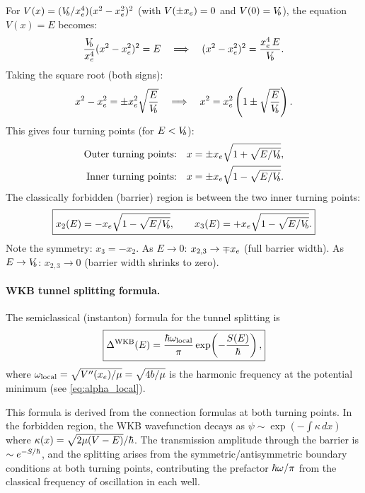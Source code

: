 For $V(x) = (V_{\!b}/x_e^4)(x^2 - x_e^2)^2$ (with $V(\pm x_e) = 0$ and $V(0) = V_{\!b}$), the equation $V(x) = E$ becomes:
\begin{equation}
  \frac{V_{\!b}}{x_e^4}(x^2 - x_e^2)^2 = E
  \quad\Longrightarrow\quad
  (x^2 - x_e^2)^2 = \frac{x_e^4\,E}{V_{\!b}}.
\end{equation}
Taking the square root (both signs):
\begin{equation}
  x^2 - x_e^2 = \pm x_e^2\sqrt{\frac{E}{V_{\!b}}}
  \quad\Longrightarrow\quad
  x^2 = x_e^2\left(1 \pm \sqrt{\frac{E}{V_{\!b}}}\right).
\end{equation}
This gives four turning points (for $E < V_{\!b}$):
\begin{align}
  \text{Outer turning points:}\quad & x = \pm x_e\sqrt{1 + \sqrt{E/V_{\!b}}},\label{eq:tp_outer}\\
  \text{Inner turning points:}\quad & x = \pm x_e\sqrt{1 - \sqrt{E/V_{\!b}}}.\label{eq:tp_inner}
\end{align}
The classically forbidden (barrier) region is between the two inner turning points:
\begin{equation}\label{eq:barrier_region}
  \boxed{x_2(E) = -x_e\sqrt{1 - \sqrt{E/V_{\!b}}}, \qquad x_3(E) = +x_e\sqrt{1 - \sqrt{E/V_{\!b}}}.}
\end{equation}
Note the symmetry: $x_3 = -x_2$.
As $E \to 0$: $x_{2,3} \to \mp x_e$ (full barrier width).
As $E \to V_{\!b}$: $x_{2,3} \to 0$ (barrier width shrinks to zero).

\paragraph{WKB tunnel splitting formula.}

The semiclassical (instanton) formula for the tunnel splitting is
\begin{equation}\label{eq:WKB_splitting}
  \boxed{\Delta^{\text{WKB}}(E) = \frac{\hbar\omega_{\text{local}}}{\pi}\exp\!\left(-\frac{S(E)}{\hbar}\right),}
\end{equation}
where $\omega_{\text{local}} = \sqrt{V''(x_e)/\mu} = \sqrt{4b/\mu}$ is the harmonic frequency at the potential minimum (see \cref{eq:alpha_local}).

This formula is derived from the connection formulas at both turning points.
In the forbidden region, the WKB wavefunction decays as $\psi \sim \exp(-\int\kappa\,dx)$ where $\kappa(x) = \sqrt{2\mu(V-E)}/\hbar$.
The transmission amplitude through the barrier is $\sim e^{-S/\hbar}$, and the splitting arises from the symmetric/antisymmetric boundary conditions at both turning points, contributing the prefactor $\hbar\omega/\pi$ from the classical frequency of oscillation in each well.

